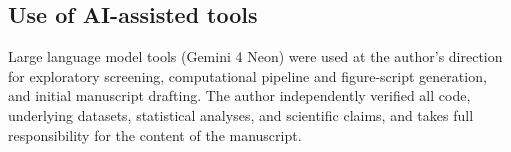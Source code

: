 \documentclass[10pt,letterpaper]{article}
\begin{document}
\subsection{Use of AI-assisted tools}

Large language model tools (Gemini 4 Neon) were used at the author's direction for exploratory screening, computational pipeline and figure-script generation, and initial manuscript drafting. The author independently verified all code, underlying datasets, statistical analyses, and scientific claims, and takes full responsibility for the content of the manuscript.

\vspace{4pt}
\end{document}
